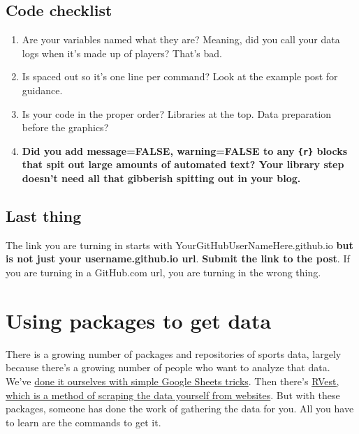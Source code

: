 \documentclass[
  letterpaper,
  DIV=11,
  numbers=noendperiod]{scrreprt}
\providecommand{\tightlist}{%
  \setlength{\itemsep}{0pt}\setlength{\parskip}{0pt}}\usepackage{longtable,booktabs,array}
\begin{document}
\hypertarget{code-checklist}{%
\section{Code checklist}\label{code-checklist}}

\begin{enumerate}
\def\labelenumi{\arabic{enumi}.}
\tightlist
\item
  Are your variables named what they are? Meaning, did you call your
  data logs when it's made up of players? That's bad.
\item
  Is spaced out so it's one line per command? Look at the example post
  for guidance.
\item
  Is your code in the proper order? Libraries at the top. Data
  preparation before the graphics?
\item
  \textbf{Did you add message=FALSE, warning=FALSE to any \texttt{\{r\}}
  blocks that spit out large amounts of automated text? Your library
  step doesn't need all that gibberish spitting out in your blog.}
\end{enumerate}

\hypertarget{last-thing}{%
\section{Last thing}\label{last-thing}}

The link you are turning in starts with YourGitHubUserNameHere.github.io
\textbf{but is not just your username.github.io url}. \textbf{Submit the
link to the post}. If you are turning in a GitHub.com url, you are
turning in the wrong thing.


\hypertarget{using-packages-to-get-data}{%
\chapter{Using packages to get data}\label{using-packages-to-get-data}}

There is a growing number of packages and repositories of sports data,
largely because there's a growing number of people who want to analyze
that data. We've
\href{http://mattwaite.github.io/sports/data-structures-and-types.html\#a-simple-way-to-get-data}{done
it ourselves with simple Google Sheets tricks}. Then there's
\href{http://mattwaite.github.io/sports/intro-to-rvest.html}{RVest,
which is a method of scraping the data yourself from websites}. But with
these packages, someone has done the work of gathering the data for you.
All you have to learn are the commands to get it.
\end{document}
